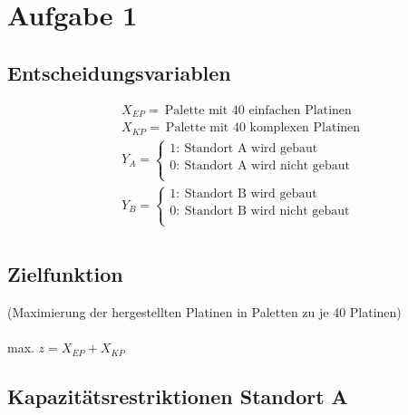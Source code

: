\documentclass[a4paper,11pt]{article}
\begin{document}
\raggedright %

\section*{Aufgabe 1}

\subsection*{Entscheidungsvariablen}

\begin{align*}
& X_{EP} = ~\text{Palette mit 40 einfachen Platinen} \\
& X_{KP} = ~\text{Palette mit 40 komplexen Platinen} \\
& Y_A = \left\{\begin{array}{l}
            1: ~\text{Standort A wird gebaut} \\
            0: ~\text{Standort A wird nicht gebaut} \\
          \end{array}\right. \\
%
&Y_B = \left\{\begin{array}{l}
            1: ~\text{Standort B wird gebaut} \\
            0: ~\text{Standort B wird nicht gebaut} \\
          \end{array}\right. \\
\end{align*}

\subsection*{Zielfunktion}
(Maximierung der hergestellten Platinen in Paletten zu je 40 Platinen) \\~\\

max. $z  = X_{EP} + X_{KP}$ \\

\subsection*{Kapazitätsrestriktionen Standort A}
\end{document}
